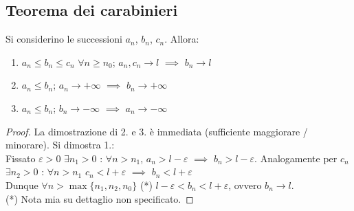 \documentclass[10pt]{article}
\theoremstyle{plain}
\begin{document}
\subsection{Teorema dei carabinieri}
\begin{ther}
    Si considerino le successioni $a_n$, $b_n$, $c_n$. Allora:
    \begin{enumerate}
        \item $a_n \leq b_n \leq c_n$ $\forall n \geq n_0$; $a_n, c_n \rightarrow l$ $\implies$ $b_n \rightarrow l$
        \item $a_n \leq b_n$; $a_n \rightarrow +\infty$ $\implies$ $b_n \rightarrow +\infty$
        \item $a_n \leq b_n$; $b_n \rightarrow -\infty$ $\implies$ $a_n \rightarrow -\infty$
    \end{enumerate}
\end{ther}
\begin{proof}
    La dimostrazione di 2. e 3. è immediata (sufficiente maggiorare / minorare). Si dimostra 1.:
    \\Fissato $\varepsilon > 0$ $\exists n_1 > 0$ : $\forall n > n_1$, $a_n > l - \varepsilon$ $\implies$ $b_n > l - \varepsilon$. Analogamente per $c_n$ $\exists n_2 > 0$ : $\forall n > n_1$ $c_n < l + \varepsilon$ $\implies$ $b_n < l + \varepsilon$
    \\Dunque $\forall n > \max \{n_1, n_2, n_0\}$ (*) $l-\varepsilon < b_n < l + \varepsilon$, ovvero $b_n \rightarrow l$.
    \\(*) Nota mia su dettaglio non specificato.
\end{proof}
\end{document}

